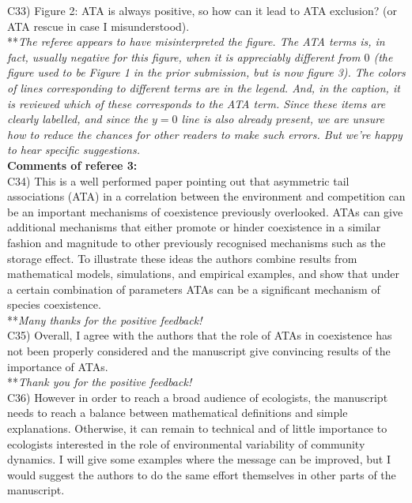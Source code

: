 \documentclass[letterpaper,11pt]{article}
\begin{document}
\noindent C33) Figure 2: ATA is always positive, so how can it lead to ATA exclusion? (or ATA rescue in case I misunderstood). \\

\noindent ***\emph{The referee appears to have misinterpreted the figure. The ATA terms is, in fact, usually
negative for this figure, when it is appreciably different from $0$ (the figure used to be Figure 1 in the 
prior submission, but is now figure 3). 
The colors of lines corresponding to different terms are in the legend. And, in the caption,
it is reviewed which of these corresponds to the ATA term. Since these items are clearly labelled, and since 
the $y=0$ line is also already present, we are unsure how to reduce the chances for other readers to make
such errors. But we're happy to hear specific suggestions.} \\

\noindent \textbf{Comments of referee 3:} \\
  
\noindent C34) This is a well performed paper pointing out that asymmetric tail associations (ATA) in a correlation between the environment and competition can be an important mechanisms of coexistence previously overlooked. ATAs can give additional mechanisms that either promote or hinder coexistence in a similar fashion and magnitude to other previously recognised mechanisms such as the storage effect. To illustrate these ideas the authors combine results from mathematical models, simulations, and empirical examples, and show that under a certain combination of parameters ATAs can be a significant mechanism of species coexistence. \\

\noindent ***\emph{Many thanks for the positive feedback!} \\

\noindent C35) Overall, I agree with the authors that the role of ATAs in coexistence has not been properly considered and the manuscript give convincing results of the importance of ATAs. \\

\noindent ***\emph{Thank you for the positive feedback!} \\

\noindent C36) However in order to reach a broad audience of ecologists, the manuscript needs to reach a balance between mathematical definitions and simple explanations. Otherwise, it can remain to technical and of little importance to ecologists interested in the role of environmental variability of community dynamics. I will give some examples where the message can be improved, but I would suggest the authors to do the same effort themselves in other parts of the manuscript. \\
\end{document}

